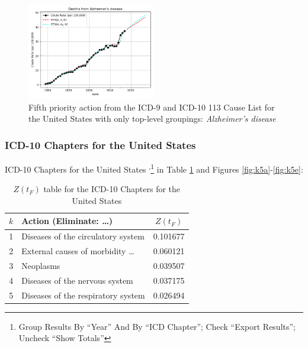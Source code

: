 \documentclass[10pt, a4paper, twocolumn]{IEEEconf}
\begin{document}
\begin{figure}[H]
  \centering
  \includegraphics[width=0.5\textwidth]{results/US_ICD_113_SELECTED_CAUSES_ROOTS/Alzheimer_s_disease_ets.png}
  \caption{Fifth priority action from the ICD-9 and ICD-10 113 Cause List for the United States with only top-level groupings: \textit{Alzheimer's disease}}\label{fig:k4e}
\end{figure}

\clearpage

\subsubsection{ICD-10 Chapters for the United States}

ICD-10 Chapters for the United States \citep{centers2017underlying}\textsuperscript{,}\footnote{Group Results By \enquote{Year} And By \enquote{ICD Chapter}; Check \enquote{Export Results}; Uncheck \enquote{Show Totals}} in Table \ref{table:ztable5} and Figures \ref{fig:k5a}-\ref{fig:k5e}:

\begin{table}[H]
  \centering
  \begin{tabular}{clc}
    \toprule
      $k$ & Action (Eliminate: \ldots) & $Z(t_F)$ \\
    \midrule
      1 &         Diseases of the circulatory system & 0.101677 \\
      2 &        External causes of morbidity \ldots & 0.060121 \\
      3 &                                  Neoplasms & 0.039507 \\
      4 &             Diseases of the nervous system & 0.037175 \\
      5 &         Diseases of the respiratory system & 0.026494 \\
  \end{tabular}
  \caption{$Z(t_F)$ table for the ICD-10 Chapters for the United States}
  \label{table:ztable5}
\end{table}
\end{document}
